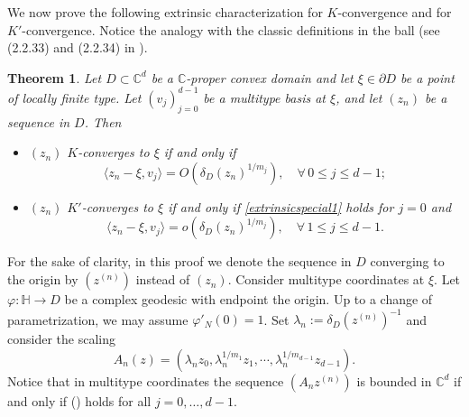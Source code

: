 \documentclass[11pt, reqno]{amsart}
\numberwithin{equation}{section}
\newtheorem{theorem}{Theorem}[section]
\theoremstyle{definition}
\newcommand{\C}{\mathbb{C}}
\renewcommand{\H}{\mathbb{H}}
\begin{document}
{		We now  prove  the following extrinsic characterization for $K$-convergence and for $K'$-convergence. Notice the analogy with the classic definitions in the ball (see (2.2.33) and (2.2.34) in \cite{Abatebook}).
		\begin{theorem}\label{extrinsicspecial}
			Let $D\subset\C^d$ be a $\C$-proper convex domain and let $\xi\in\partial D$ be a point of locally finite type.  Let $(v_j)_{j=0}^{d-1}$ be a multitype  basis at $\xi$, and 
			let $(z_n)$ be a sequence in $D$. Then 
			\begin{itemize}
				\item[(i)]$(z_n)$ $K$-converges to $\xi$  if and only if 
				\begin{equation}\label{extrinsicspecial1}
					\langle z_n-\xi,v_j\rangle=O\left(\delta_D(z_n)^{1/m_j}\right),\quad \forall \,0\leq j\leq d-1;
				\end{equation} 
				\item[(ii)]
				$(z_n)$  $K'$-converges to $\xi$ if and only if 
				\eqref{extrinsicspecial1} holds for $j=0$ and
				\begin{equation}\label{extrinsicspecial2}
					\langle z_n-\xi,v_j\rangle=o\left(\delta_D(z_n)^{1/m_j}\right), \quad \forall \,1\leq j\leq d-1.
				\end{equation}
			\end{itemize}
		\end{theorem}
		\proof
		For the sake of clarity, in this proof we denote the sequence  in $D$ converging to the origin by $(z^{(n)})$ instead of $(z_n)$.
		Consider  multitype coordinates at $\xi$. 
		Let  $\varphi\colon \H\to D$ be a complex geodesic with endpoint the origin. Up to a change of parametrization, we may assume $\varphi'_N(0)=1$. Set $\lambda_n:=\delta_D(z^{(n)})^{-1}$ and consider the scaling
		$$A_n(z)=(\lambda_n z_0,\lambda_n^{1/m_1}z_1,\cdots,\lambda_n^{1/m_{d-1}}z_{d-1}).$$
		Notice that in multitype coordinates the sequence $(A_nz^{(n)})$ is bounded in $\C^d$ if and only if () holds for all $j=0,\dots,d-1$.
		
}
\end{document}
